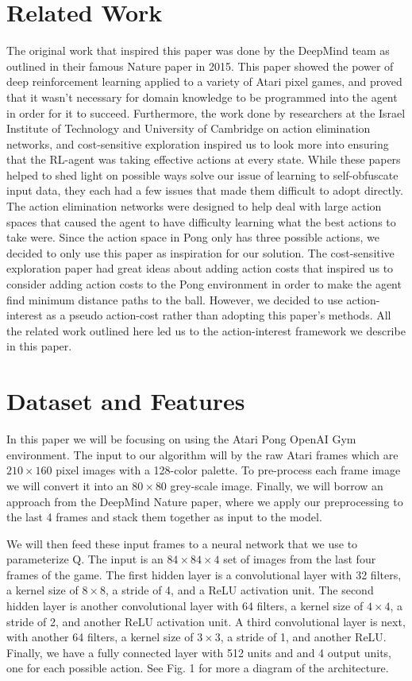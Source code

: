 \documentclass{article}
\begin{document}
\section{Related Work}

The original work that inspired this paper was done by the DeepMind team as outlined in their famous Nature paper in 2015. This paper showed the power
of deep reinforcement learning applied to a variety of Atari pixel games, and proved that it wasn't necessary for domain knowledge to be programmed into the
agent in order for it to succeed. Furthermore, the work done by researchers at the Israel Institute of Technology and University of Cambridge on action elimination networks,
and cost-sensitive exploration inspired us to look more into ensuring that the RL-agent was taking effective actions at every state. While these papers helped to shed light
on possible ways solve our issue of learning to self-obfuscate input data, they each had a few issues that made them difficult to adopt directly. The action elimination networks
were designed to help deal with large action spaces that caused the agent to have difficulty learning what the best actions to take were. Since the action space in Pong only has three
possible actions, we decided to only use this paper as inspiration for our solution. The cost-sensitive exploration paper had great ideas about adding action costs that
inspired us to consider adding action costs to the Pong environment in order to make the agent find minimum distance paths to the ball. However, we decided to use action-interest
as a pseudo action-cost rather than adopting this paper's methods. All the related work outlined here led us to the action-interest framework we describe in this paper.

\section{Dataset and Features}
In this paper we will be focusing on using the Atari Pong OpenAI Gym environment.
The input to our algorithm will by the raw Atari frames which are $210 \times 160$
pixel images with a 128-color palette. To pre-process each frame image we will convert it into an $80 \times 80$ grey-scale
image. Finally, we will borrow an approach from the DeepMind Nature paper, where we apply our preprocessing to the last 4
frames and stack them together as input to the model.

We will then feed these input frames to a neural network that we use to parameterize Q. 
The input is an $84 \times 84 \times 4$ set of images from the last four frames of the game. The first hidden layer is a convolutional layer
with 32 filters, a kernel size of $8\times8$, a stride of 4, and a ReLU activation unit. The second hidden layer is another convolutional layer
with 64 filters, a kernel size of $4\times4$, a stride of 2, and another ReLU activation unit. A third convolutional layer is next, with 
another 64 filters, a kernel size of $3\times3$, a stride of 1, and another ReLU. Finally, we have a fully connected layer with 512 units
and and 4 output units, one for each possible action. See Fig. 1 for more a diagram of the architecture.
\end{document}

